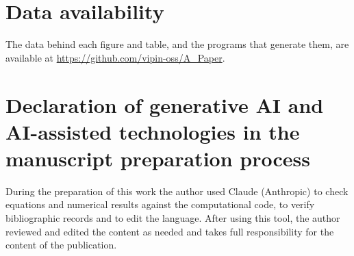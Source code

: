 \documentclass[12pt,a4paper]{article}
\begin{document}








\section*{Data availability}
The data behind each figure and table, and the programs that generate them, are
available at \url{https://github.com/vipin-oss/A_Paper}.

\section*{Declaration of generative AI and AI-assisted technologies in the manuscript preparation process}
During the preparation of this work the author used Claude (Anthropic) to check
equations and numerical results against the computational code, to verify
bibliographic records and to edit the language. After using this tool, the author
reviewed and edited the content as needed and takes full responsibility for the
content of the publication.

\appendix





\end{document}
